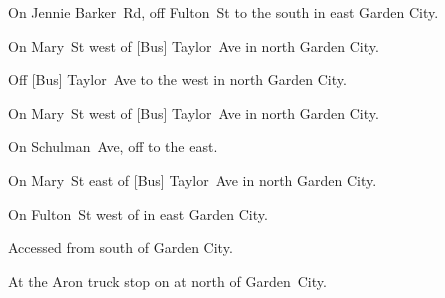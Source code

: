 

\begin{LocationList}

On Jennie Barker~Rd, off   Fulton~St to the south in east Garden City.

\Location{\GarageHQ \Garage}
On Mary~St west of [Bus] Taylor~Ave in north Garden City.

Off [Bus] Taylor~Ave to the west in north Garden City.

On Mary~St west of [Bus] Taylor~Ave in north Garden City.

On Schulman~Ave, off    to the east.

On Mary~St east of [Bus] Taylor~Ave in north Garden City.

On   Fulton~St west of  in east Garden City.

Accessed from 
south of Garden City.

At the Aron truck stop on  at   north of Garden~City.

\end{LocationList}
